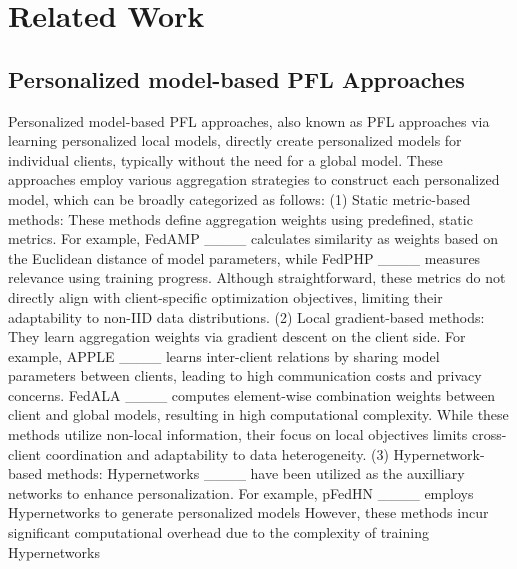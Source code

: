 \section{Related Work}
\subsection{Personalized model-based PFL Approaches}
Personalized model-based PFL approaches, also known as PFL approaches via learning personalized local models, directly create personalized models for individual clients, typically without the need for a global model. These approaches employ various aggregation strategies to construct each personalized model, which can be broadly categorized as follows:
(1)	Static metric-based methods: These methods define aggregation weights using predefined, static metrics. For example, FedAMP ____ calculates similarity as weights based on the Euclidean distance of model parameters, while FedPHP ____ measures relevance using training progress. 
Although straightforward, these metrics do not directly align with client-specific optimization objectives, limiting their adaptability to non-IID data distributions.
(2) Local gradient-based methods: They learn aggregation weights via gradient descent on the client side. For example, APPLE ____ learns inter-client relations by sharing model parameters between clients, leading to high communication costs and privacy concerns. FedALA ____ computes element-wise combination weights between client and global models, resulting in high computational complexity. While these methods utilize non-local information, their focus on local objectives limits cross-client coordination and adaptability to data heterogeneity.
(3) Hypernetwork-based methods: Hypernetworks ____ have been utilized as the auxilliary networks to enhance personalization. For example, pFedHN ____ employs Hypernetworks to generate personalized models
However, these methods incur significant computational overhead due to the complexity of training Hypernetworks

